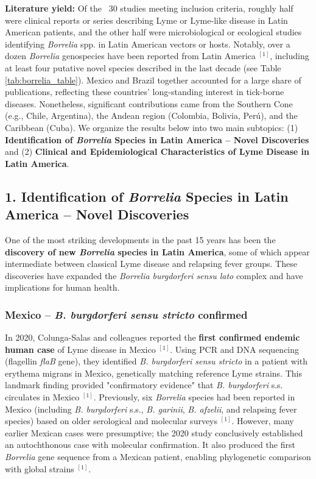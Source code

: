 \documentclass[11pt,letterpaper]{article}
\newcommand{\mycite}[1]{$^{[#1]}$}
\begin{document}
\textbf{Literature yield:} Of the ~30 studies meeting inclusion criteria, roughly half were clinical reports or series describing Lyme or Lyme-like disease in Latin American patients, and the other half were microbiological or ecological studies identifying \textit{Borrelia} spp. in Latin American vectors or hosts. Notably, over a dozen \textit{Borrelia} genospecies have been reported from Latin America \mycite{1}, including at least four putative novel species described in the last decade (see Table \ref{tab:borrelia_table}). Mexico and Brazil together accounted for a large share of publications, reflecting these countries' long-standing interest in tick-borne diseases. Nonetheless, significant contributions came from the Southern Cone (e.g., Chile, Argentina), the Andean region (Colombia, Bolivia, Perú), and the Caribbean (Cuba). We organize the results below into two main subtopics: (1) \textbf{Identification of \textit{Borrelia} Species in Latin America – Novel Discoveries} and (2) \textbf{Clinical and Epidemiological Characteristics of Lyme Disease in Latin America}.

\subsection{1. Identification of \textit{Borrelia} Species in Latin America – Novel Discoveries}
One of the most striking developments in the past 15 years has been the \textbf{discovery of new \textit{Borrelia} species in Latin America}, some of which appear intermediate between classical Lyme disease and relapsing fever groups. These discoveries have expanded the \textit{Borrelia burgdorferi sensu lato} complex and have implications for human health.

\subsubsection{Mexico – \textit{B. burgdorferi sensu stricto} confirmed}
In 2020, Colunga-Salas and colleagues reported the \textbf{first confirmed endemic human case} of Lyme disease in Mexico \mycite{1}. Using PCR and DNA sequencing (flagellin \textit{flaB} gene), they identified \textit{B. burgdorferi sensu stricto} in a patient with erythema migrans in Mexico, genetically matching reference Lyme strains. This landmark finding provided "confirmatory evidence" that \textit{B. burgdorferi} s.s. circulates in Mexico \mycite{1}. Previously, six \textit{Borrelia} species had been reported in Mexico (including \textit{B. burgdorferi} s.s., \textit{B. garinii}, \textit{B. afzelii}, and relapsing fever species) based on older serological and molecular surveys \mycite{1}. However, many earlier Mexican cases were presumptive; the 2020 study conclusively established an autochthonous case with molecular confirmation. It also produced the first \textit{Borrelia} gene sequence from a Mexican patient, enabling phylogenetic comparison with global strains \mycite{1}.
\end{document}
